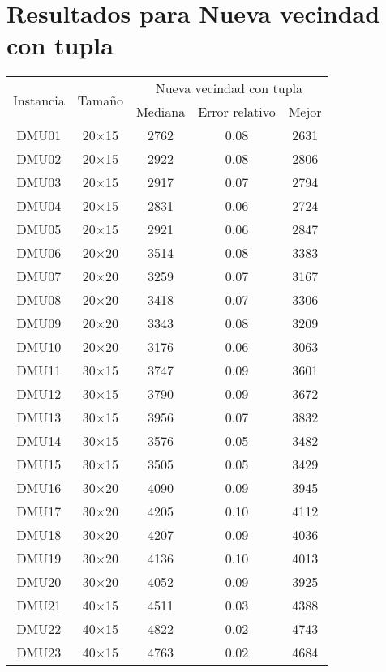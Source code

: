 \section{Resultados para Nueva vecindad con tupla}

\begin{table}[H]
\centering
\begin{tabular}{@{}ccccc@{}}
\toprule
\multirow{2}{*}{Instancia} & \multirow{2}{*}{Tamaño} & \multicolumn{3}{c}{Nueva vecindad con tupla} \\ \cmidrule(lr){3-5}
& & Mediana& Error relativo & Mejor  \\ \midrule
DMU01 & 20$\times$15 & 2762 & 0.08 & 2631\\ 
DMU02 & 20$\times$15 & 2922 & 0.08 & 2806\\ 
DMU03 & 20$\times$15 & 2917 & 0.07 & 2794\\ 
DMU04 & 20$\times$15 & 2831 & 0.06 & 2724\\ 
DMU05 & 20$\times$15 & 2921 & 0.06 & 2847\\ 
DMU06 & 20$\times$20 & 3514 & 0.08 & 3383\\ 
DMU07 & 20$\times$20 & 3259 & 0.07 & 3167\\ 
DMU08 & 20$\times$20 & 3418 & 0.07 & 3306\\ 
DMU09 & 20$\times$20 & 3343 & 0.08 & 3209\\ 
DMU10 & 20$\times$20 & 3176 & 0.06 & 3063\\ 
DMU11 & 30$\times$15 & 3747 & 0.09 & 3601\\ 
DMU12 & 30$\times$15 & 3790 & 0.09 & 3672\\ 
DMU13 & 30$\times$15 & 3956 & 0.07 & 3832\\ 
DMU14 & 30$\times$15 & 3576 & 0.05 & 3482\\ 
DMU15 & 30$\times$15 & 3505 & 0.05 & 3429\\ 
DMU16 & 30$\times$20 & 4090 & 0.09 & 3945\\ 
DMU17 & 30$\times$20 & 4205 & 0.10 & 4112\\ 
DMU18 & 30$\times$20 & 4207 & 0.09 & 4036\\ 
DMU19 & 30$\times$20 & 4136 & 0.10 & 4013\\ 
DMU20 & 30$\times$20 & 4052 & 0.09 & 3925\\ 
DMU21 & 40$\times$15 & 4511 & 0.03 & 4388\\ 
DMU22 & 40$\times$15 & 4822 & 0.02 & 4743\\ 
DMU23 & 40$\times$15 & 4763 & 0.02 & 4684\\ 

\end{tabular}
\end{table}
